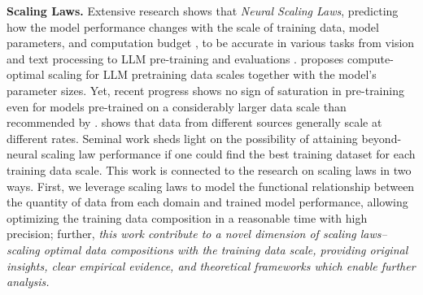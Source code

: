 \documentclass{article} %
\begin{document}
\textbf{Scaling Laws.} Extensive research shows that \textit{Neural Scaling Laws}, predicting how the model performance changes with the scale of training data, model parameters, and computation budget \citep{kaplan2020scaling}, to be accurate in various tasks from vision and text processing \citep{ alabdulmohsin2022revisiting} to LLM pre-training \citep{rae2021scaling} and evaluations \citep{gadre2024language}. 
\citep{hoffmann2022training} proposes compute-optimal scaling for LLM pretraining data scales together with the model's parameter sizes. Yet, recent progress \citep{llama3modelcard,mehta2024openelm} shows no sign of saturation in pre-training even for models pre-trained on a considerably larger data scale than recommended by \citep{hoffmann2022training}. \citep{bahri2021explaining} shows that data from different sources generally scale at different rates. Seminal work \citep{sorscher2022beyond} sheds light on the possibility of attaining beyond-neural scaling law performance if one could find the best training dataset for each training data scale. This work is connected to the research on scaling laws in two ways. First, we leverage scaling laws to model the functional relationship between the quantity of data from each domain and trained model performance, allowing optimizing the training data composition in a reasonable time with high precision; further, \textit{this work contribute to a novel dimension of scaling laws–scaling optimal data compositions with the training data scale, providing original insights, clear empirical evidence, and theoretical frameworks which enable further analysis.}



\end{document}
